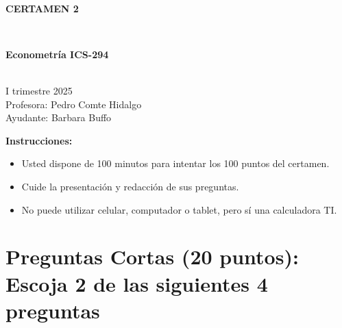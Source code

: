 \documentclass[10pt,a4paper]{article}
\begin{document}
\vspace{5cm}



\begin{center}
\begin{large}
\textbf{\\CERTAMEN 2}
\end{large}\\
\end{center}

\begin{center}
\begin{large}
\textbf{Econometría ICS-294}
\end{large}\\
\vspace{0.2cm}
I trimestre 2025\\
Profesora: Pedro Comte Hidalgo\\
Ayudante: Barbara Buffo
\end{center}

\textbf{Instrucciones:} 

\begin{itemize}

    \item Usted dispone de 100 minutos  para intentar los 100 puntos del certamen.
    \item Cuide la presentación y redacción de sus preguntas.
    \item No puede utilizar celular, computador o tablet, pero sí una calculadora TI.
     
\end{itemize}

\section{Preguntas Cortas (20 puntos): Escoja 2 de las siguientes 4 preguntas}
\end{document}
